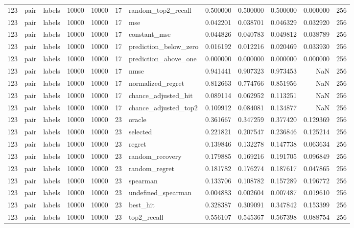 \begin{tabular}{rllrrrlrrrrr}
123 & pair & labels & 10000 & 10000 & 17 & random_top2_recall & 0.500000 & 0.500000 & 0.500000 & 0.000000 & 256 \\
123 & pair & labels & 10000 & 10000 & 17 & mse & 0.042201 & 0.038701 & 0.046329 & 0.032920 & 256 \\
123 & pair & labels & 10000 & 10000 & 17 & constant_mse & 0.044826 & 0.040783 & 0.049812 & 0.038789 & 256 \\
123 & pair & labels & 10000 & 10000 & 17 & prediction_below_zero & 0.016192 & 0.012216 & 0.020469 & 0.033930 & 256 \\
123 & pair & labels & 10000 & 10000 & 17 & prediction_above_one & 0.000000 & 0.000000 & 0.000000 & 0.000000 & 256 \\
123 & pair & labels & 10000 & 10000 & 17 & nmse & 0.941441 & 0.907323 & 0.973453 & NaN & 256 \\
123 & pair & labels & 10000 & 10000 & 17 & normalized_regret & 0.812663 & 0.774766 & 0.851956 & NaN & 256 \\
123 & pair & labels & 10000 & 10000 & 17 & chance_adjusted_hit & 0.089114 & 0.062952 & 0.113251 & NaN & 256 \\
123 & pair & labels & 10000 & 10000 & 17 & chance_adjusted_top2 & 0.109912 & 0.084081 & 0.134877 & NaN & 256 \\
123 & pair & labels & 10000 & 10000 & 23 & oracle & 0.361667 & 0.347259 & 0.377420 & 0.129369 & 256 \\
123 & pair & labels & 10000 & 10000 & 23 & selected & 0.221821 & 0.207547 & 0.236846 & 0.125214 & 256 \\
123 & pair & labels & 10000 & 10000 & 23 & regret & 0.139846 & 0.132278 & 0.147738 & 0.063634 & 256 \\
123 & pair & labels & 10000 & 10000 & 23 & random_recovery & 0.179885 & 0.169216 & 0.191705 & 0.096849 & 256 \\
123 & pair & labels & 10000 & 10000 & 23 & random_regret & 0.181782 & 0.176274 & 0.187617 & 0.047865 & 256 \\
123 & pair & labels & 10000 & 10000 & 23 & spearman & 0.133706 & 0.108782 & 0.157289 & 0.196772 & 256 \\
123 & pair & labels & 10000 & 10000 & 23 & undefined_spearman & 0.004883 & 0.002604 & 0.007487 & 0.019610 & 256 \\
123 & pair & labels & 10000 & 10000 & 23 & best_hit & 0.328387 & 0.309091 & 0.347842 & 0.153399 & 256 \\
123 & pair & labels & 10000 & 10000 & 23 & top2_recall & 0.556107 & 0.545367 & 0.567398 & 0.088754 & 256 \\

\end{tabular}
